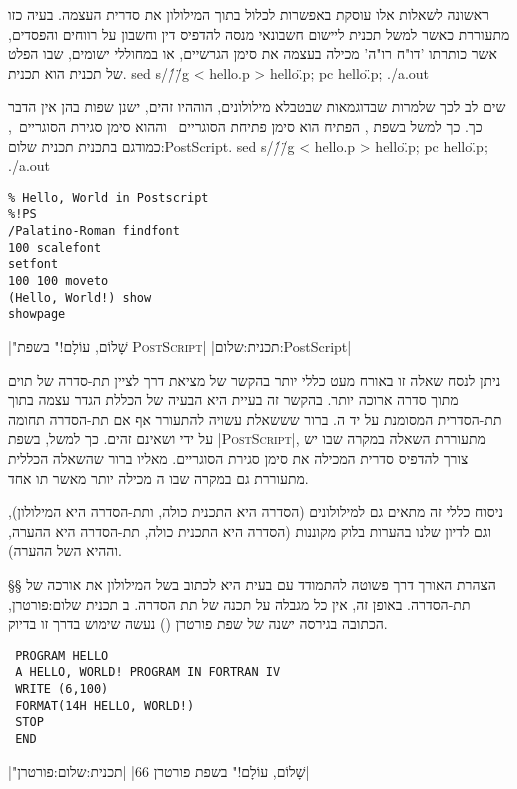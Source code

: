 ראשונה לשאלות אלו עוסקת באפשרות לכלול בתוך המילולון את סדרית ה עצמה.
בעיה כזו מתעוררת כאשר למשל תכנית  ליישום חשבונאי מנסה להדפיס דין וחשבון על
רווחים והפסדים, אשר כותרתו 'דו"ח רו"ה' מכילה בעצמה את סימן הגרשיים, או במחוללי
ישומים, שבו הפלט של תכנית הוא תכנית.
sed s/\'/\"/g < hello.p > hello\".p; pc hello\".p; ./a.out
\END

שים לב לכך שלמרות שבדוגמאות שב טבלא מילולונים, ה וה היו זהים,
ישנן שפות בהן אין הדבר כך. כך למשל בשפת , הפתיח הוא
סימן פתיחת הסוגריים~ וה הוא סימן סגירת הסוגריים~, כמודגם
בתכנית  תכנית שלום:PostScript.
sed s/\'/\"/g < hello.p > hello\".p; pc hello\".p; ./a.out
\END

\begin{תכנית}
\setLTR
\lstset{language=Postscript,style=numbered}
\begin{lstlisting}
% Hello, World in Postscript
%!PS
/Palatino-Roman findfont
100 scalefont
setfont
100 100 moveto
(Hello, World!) show
showpage
\end{lstlisting}
\setRTL
{}|"שָׁלוֹם, עוֹלָם!" בשפת \textsc{PostScript}|
|תכנית:שלום:PostScript|
\end{תכנית}

ניתן לנסח שאלה זו באורח מעט כללי יותר בהקשר של מציאת דרך לציין תת-סדרה של תוים
מתוך סדרה ארוכה יותר. בהקשר זה בעיית  היא הבעיה של הכללת הגדר
עצמה בתוך תת-הסדרית המסומנת על יד ה. ברור שששאלת  עשויה
להתעורר אף אם תת-הסדרה תחומה על ידי  ו שאינם זהים. כך למשל, בשפת
\E|\textsc{PostScript}|, מתעוררת השאלה במקרה שבו יש צורך להדפיס סדרית המכילה
את סימן סגירת הסוגריים. מאליו ברור שהשאלה הכללית מתעוררת גם במקרה שבו ה
מכילה יותר מאשר תו אחד.

ניסוח כללי זה מתאים גם למילולונים (הסדרה היא התכנית כולה, ותת-הסדרה היא
המילולון), וגם לדיון שלנו בהערות בלוק מקוננות (הסדרה היא התכנית כולה, תת-הסדרה
היא ההערה, וה היא ה של ההערה).

§§ הצהרת האורך
דרך פשוטה להתמודד עם בעית  היא לכתוב ב של המילולון את
אורכה של תת-הסדרה. באופן זה, אין כל מגבלה על תכנה של תת הסדרה. ב
תכנית שלום:פורטרן, הכתובה בגירסה ישנה של שפת פורטרן () נעשה
שימוש בדרך זו בדיוק.

\begin{תכנית}
\setLTR
\lstset{language=[77]Fortran,style=Numbered,morecomment=[f]C}
\begin{lstlisting}
 PROGRAM HELLO
 A HELLO, WORLD! PROGRAM IN FORTRAN IV
 WRITE (6,100)
 FORMAT(14H HELLO, WORLD!)
 STOP
 END
\end{lstlisting}
\setRTL
{}|"שָׁלוֹם, עוֹלָם!" בשפת פורטרן 66|
|תכנית:שלום:פורטרן|
\end{תכנית}

